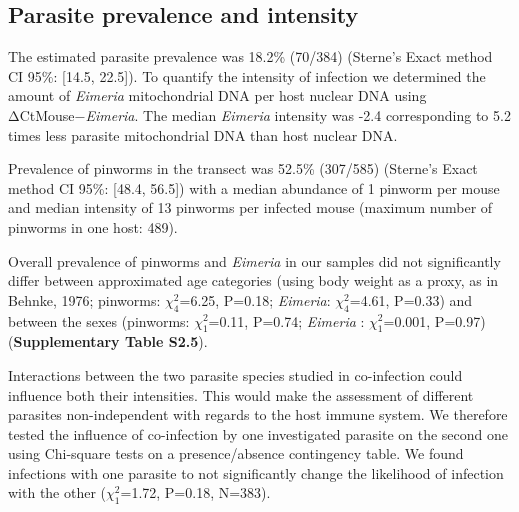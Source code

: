 \subsection{Parasite prevalence and intensity}
The estimated parasite prevalence was 18.2\% (70/384) (Sterne’s Exact method CI 95\%: [14.5, 22.5]). To quantify the intensity of infection we determined the amount of \textit{Eimeria} mitochondrial DNA per host nuclear DNA using ΔCtMouse−\textit{Eimeria}. The median \textit{Eimeria} intensity was -2.4 corresponding to 5.2 times less parasite mitochondrial DNA than host nuclear DNA.
\par Prevalence of pinworms in the transect was 52.5\% (307/585) (Sterne’s Exact method CI 95\%: [48.4, 56.5]) with a median abundance of 1 pinworm per mouse and median intensity of 13 pinworms per infected mouse (maximum number of pinworms in one host: 489). 
\par Overall prevalence of pinworms and \textit{Eimeria} in our samples did not significantly differ between approximated age categories (using body weight as a proxy, as in Behnke, 1976; pinworms: $\chi_{4}^{2}$=6.25, P=0.18; \textit{Eimeria}: $\chi_{4}^{2}$=4.61, P=0.33) and between the sexes (pinworms: $\chi_{1}^{2}$=0.11, P=0.74; \textit{Eimeria} : $\chi_{1}^{2}$=0.001, P=0.97) (\textbf{Supplementary Table S2.5}).
\par Interactions between the two parasite species studied in co-infection could influence both their intensities. This would make the assessment of different parasites non-independent with regards to the host immune system. We therefore tested the influence of co-infection by one investigated parasite on the second one using Chi-square tests on a presence/absence contingency table. We found infections with one parasite to not significantly change the likelihood of infection with the other ($\chi_{1}^{2}$=1.72, P=0.18, N=383).

